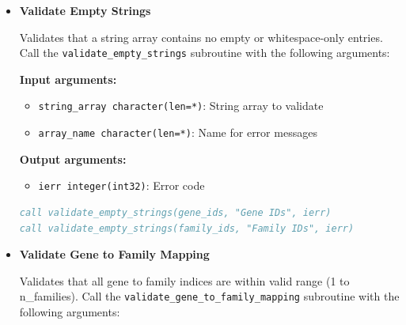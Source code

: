 \begin{enumerate}
\begin{itemize}
\begin{itemize}
                    \item \texttt{ierr integer(int32)}: Error code
                  \end{itemize}
                  \begin{lstlisting}[language=Fortran, caption={Validate Expression Data}]
! Validate expression data (disallow negative values)
call validate_expression_data(expr_data, .false., ierr)

! Validate allowing negative values (e.g., for log-fold changes)
call validate_expression_data(expr_data, .true., ierr)
                  \end{lstlisting}
                  
            \item \textbf{Validate Empty Strings}
                  
                  Validates that a string array contains no empty or whitespace-only entries.
                  Call the \texttt{validate\_empty\_strings} subroutine with the following
                  arguments:
                  
                  \textbf{Input arguments:}
                  \begin{itemize}
                    \item \texttt{string\_array character(len=*)}: String array to validate
                          
                    \item \texttt{array\_name character(len=*)}: Name for error messages
                  \end{itemize}
                  \textbf{Output arguments:}
                  \begin{itemize}
                    \item \texttt{ierr integer(int32)}: Error code
                  \end{itemize}
                  \begin{lstlisting}[language=Fortran, caption={Validate String Array}]
call validate_empty_strings(gene_ids, "Gene IDs", ierr)
call validate_empty_strings(family_ids, "Family IDs", ierr)
                  \end{lstlisting}
                  
            \item \textbf{Validate Gene to Family Mapping}
                  
                  Validates that all gene to family indices are within valid range (1 to
                  n\_families). Call the \texttt{validate\_gene\_to\_family\_mapping} subroutine
                  with the following arguments:
                  

\end{itemize}
\end{enumerate}

